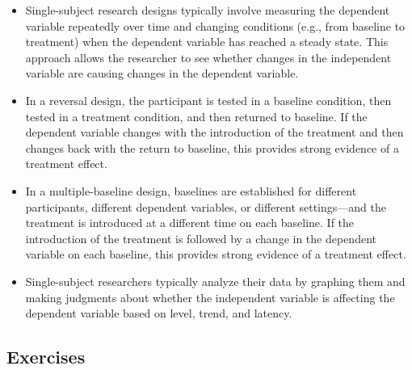 \begin{fullwidth}

\begin{itemize}


\item Single-subject research designs typically involve measuring the dependent variable repeatedly over time and changing conditions (e.g., from baseline to treatment) when the dependent variable has reached a steady state. This approach allows the researcher to see whether changes in the independent variable are causing changes in the dependent variable.

 \item In a reversal design, the participant is tested in a baseline condition, then tested in a treatment condition, and then returned to baseline. If the dependent variable changes with the introduction of the treatment and then changes back with the return to baseline, this provides strong evidence of a treatment effect.

 \item In a multiple-baseline design, baselines are established for different participants, different dependent variables, or different settings---and the treatment is introduced at a different time on each baseline. If the introduction of the treatment is followed by a change in the dependent variable on each baseline, this provides strong evidence of a treatment effect.

 \item Single-subject researchers typically analyze their data by graphing them and making judgments about whether the independent variable is affecting the dependent variable based on level, trend, and latency.


\end{itemize}

\end{fullwidth}



\subsection{Exercises}

